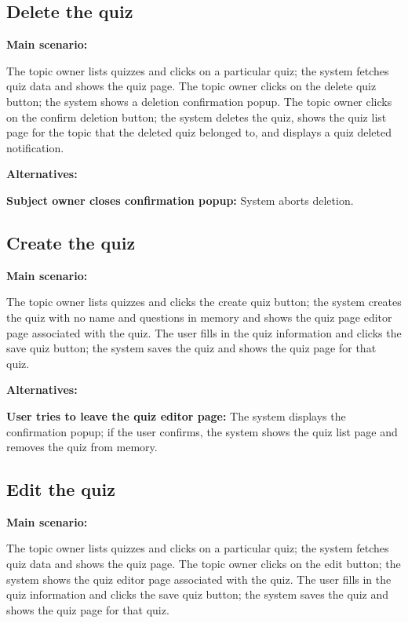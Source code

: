 \documentclass[
    english, %
]{VUMIFPSkursinis}
\begin{document}
\subsection{Delete the quiz}

\noindent\textbf{\fontsize{13}{15}\selectfont Main scenario:}

The topic owner lists quizzes and clicks on a particular quiz; the system fetches quiz data and shows the quiz page. The topic owner clicks on the delete quiz button; the system shows a deletion confirmation popup. The topic owner clicks on the confirm deletion button; the system deletes the quiz, shows the quiz list page for the topic that the deleted quiz belonged to, and displays a quiz deleted notification.

\noindent\textbf{\fontsize{13}{15}\selectfont Alternatives:}

\textbf{Subject owner closes confirmation popup:} System aborts deletion.

\subsection{Create the quiz}

\noindent\textbf{\fontsize{13}{15}\selectfont Main scenario:}

The topic owner lists quizzes and clicks the create quiz button; the system creates the quiz with no name and questions in memory and shows the quiz page editor page associated with the quiz. The user fills in the quiz information and clicks the save quiz button; the system saves the quiz and shows the quiz page for that quiz.

\noindent\textbf{\fontsize{13}{15}\selectfont Alternatives:}

\textbf{User tries to leave the quiz editor page:} The system displays the confirmation popup; if the user confirms, the system shows the quiz list page and removes the quiz from memory.

\subsection{Edit the quiz}

\noindent\textbf{\fontsize{13}{15}\selectfont Main scenario:}

The topic owner lists quizzes and clicks on a particular quiz; the system fetches quiz data and shows the quiz page. The topic owner clicks on the edit button; the system shows the quiz editor page associated with the quiz. The user fills in the quiz information and clicks the save quiz button; the system saves the quiz and shows the quiz page for that quiz.
\end{document}
